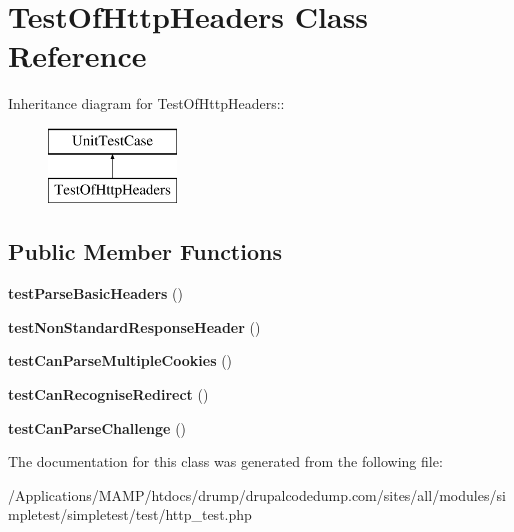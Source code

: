 \hypertarget{class_test_of_http_headers}{
\section{TestOfHttpHeaders Class Reference}
\label{class_test_of_http_headers}
}
Inheritance diagram for TestOfHttpHeaders::\begin{figure}[H]
\begin{center}
\leavevmode
\includegraphics[height=2cm]{class_test_of_http_headers}
\end{center}
\end{figure}
\subsection*{Public Member Functions}
\begin{DoxyCompactItemize}
\item 
\hypertarget{class_test_of_http_headers_ad5c3be5c756f22b50868d6d148678d2f}{
{\bfseries testParseBasicHeaders} ()}
\label{class_test_of_http_headers_ad5c3be5c756f22b50868d6d148678d2f}

\item 
\hypertarget{class_test_of_http_headers_a442517b6e4a19726f6bb92be120db8a2}{
{\bfseries testNonStandardResponseHeader} ()}
\label{class_test_of_http_headers_a442517b6e4a19726f6bb92be120db8a2}

\item 
\hypertarget{class_test_of_http_headers_a527649e6f3da59b516c11ed9082749fe}{
{\bfseries testCanParseMultipleCookies} ()}
\label{class_test_of_http_headers_a527649e6f3da59b516c11ed9082749fe}

\item 
\hypertarget{class_test_of_http_headers_aa9064a4b5e34a7d3aa478137600644f4}{
{\bfseries testCanRecogniseRedirect} ()}
\label{class_test_of_http_headers_aa9064a4b5e34a7d3aa478137600644f4}

\item 
\hypertarget{class_test_of_http_headers_a0892052980dedcf3fda0faf94e24054e}{
{\bfseries testCanParseChallenge} ()}
\label{class_test_of_http_headers_a0892052980dedcf3fda0faf94e24054e}

\end{DoxyCompactItemize}


The documentation for this class was generated from the following file:\begin{DoxyCompactItemize}
\item 
/Applications/MAMP/htdocs/drump/drupalcodedump.com/sites/all/modules/simpletest/simpletest/test/http\_\-test.php\end{DoxyCompactItemize}
